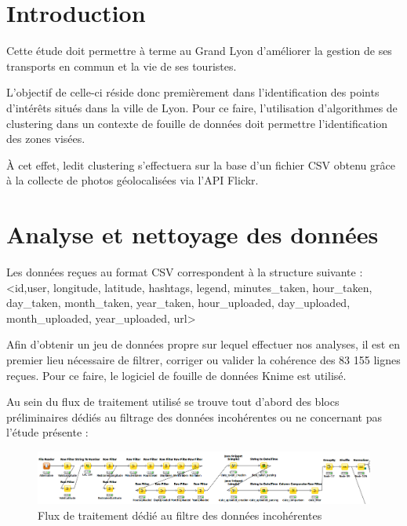 \section{Introduction}
Cette étude doit permettre à terme au Grand Lyon d'améliorer la gestion de ses transports en commun et la vie de ses touristes.

L'objectif de celle-ci réside donc premièrement dans l'identification des points d'intérêts situés dans la ville de Lyon. Pour ce faire, l'utilisation d'algorithmes de clustering dans un contexte de fouille de données doit permettre l'identification des zones visées.

À cet effet, ledit clustering s'effectuera sur la base d'un fichier CSV obtenu grâce à la collecte de photos géolocalisées via l'API Flickr.
\pagebreak


\section{Analyse et nettoyage des données}
Les données reçues au format CSV correspondent à la structure suivante :
<id,user, longitude, latitude, hashtags, legend, minutes\_taken, hour\_taken, day\_taken, month\_taken, year\_taken, hour\_uploaded, day\_uploaded, month\_uploaded, year\_uploaded, url>

Afin d'obtenir un jeu de données propre sur lequel effectuer nos analyses, il est en premier lieu nécessaire de filtrer, corriger ou valider la cohérence des 83 155 lignes reçues. Pour ce faire, le logiciel de fouille de données Knime est utilisé.

Au sein du flux de traitement utilisé se trouve tout d'abord des blocs préliminaires dédiés au filtrage des données incohérentes ou ne concernant pas l'étude présente :

\begin{figure}[H]
    \centering
    \includegraphics[width=\linewidth]{img/knime_filter.png}
    \caption{Flux de traitement dédié au filtre des données incohérentes}
    \label{knime_filter}
\end{figure}

